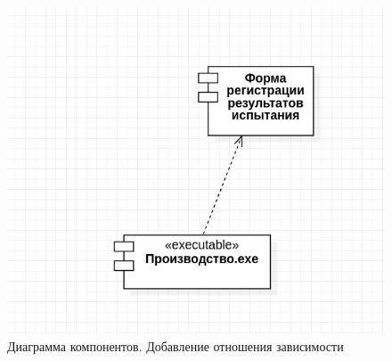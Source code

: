 \documentclass[a4paper,12pt]{extreport}
\begin{document}
\begin{figure}
	\centering
	\includegraphics[width=0.5\linewidth]{images/componentstests1}
	\caption{Диаграмма компонентов. Добавление отношения зависимости}
	\label{fig:componentstests}
\end{figure}
\end{document}
